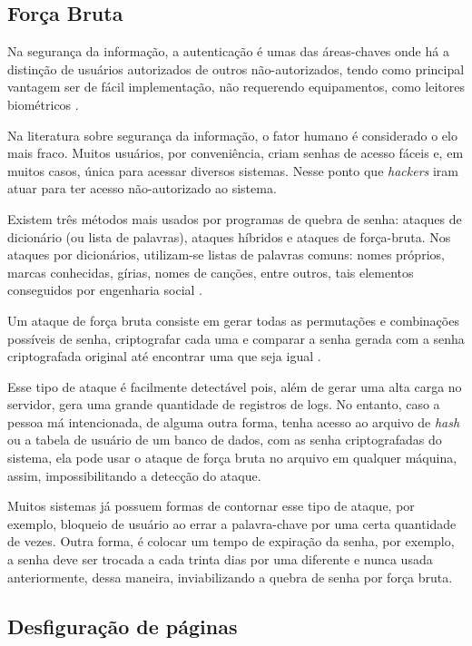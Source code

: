 \subsection{Força Bruta} \label{sec:forçabruta}

Na segurança da informação, a autenticação é umas das áreas-chaves onde há a distinção de usuários autorizados de outros não-autorizados, tendo como principal vantagem ser de fácil implementação, não requerendo equipamentos, como leitores biométricos \cite{denise-lilian}.

Na literatura sobre segurança da informação, o fator humano é considerado o elo mais fraco. Muitos usuários, por conveniência, criam senhas de acesso fáceis e, em muitos casos, única para acessar diversos sistemas. Nesse ponto que \textit{hackers} iram atuar para ter acesso não-autorizado ao sistema. 

Existem três métodos mais usados por programas de quebra de senha: ataques de dicionário (ou lista de palavras), ataques híbridos e ataques de força-bruta. Nos ataques por dicionários, utilizam-se listas de palavras comuns: nomes próprios, marcas conhecidas, gírias, nomes de canções, entre outros, tais elementos conseguidos por engenharia social \cite{univhacker}. 

 Um ataque de força bruta consiste em gerar todas as permutações e combinações possíveis de senha, criptografar cada uma e comparar a senha gerada com a senha criptografada original até encontrar uma que seja igual \cite{md5crack2012}. 

 Esse tipo de ataque é facilmente detectável pois, além de gerar uma alta carga no servidor, gera uma grande quantidade de registros de logs. No entanto, caso a pessoa má intencionada, de alguma outra forma, tenha acesso ao arquivo de \textit{hash} ou a tabela de usuário de um banco de dados, com as senha criptografadas do sistema, ela pode usar o ataque de força bruta no arquivo em qualquer máquina, assim, impossibilitando a detecção do ataque.

 Muitos sistemas já possuem formas de contornar esse tipo de ataque, por exemplo, bloqueio de usuário ao errar a palavra-chave por uma certa quantidade de vezes. Outra forma, é colocar um tempo de expiração da senha, por exemplo, a senha deve ser trocada a cada trinta dias por uma diferente e nunca usada anteriormente, dessa maneira, inviabilizando a quebra de senha por força bruta. 

 \subsection{Desfiguração de páginas} \label{sec:desfiguração}

